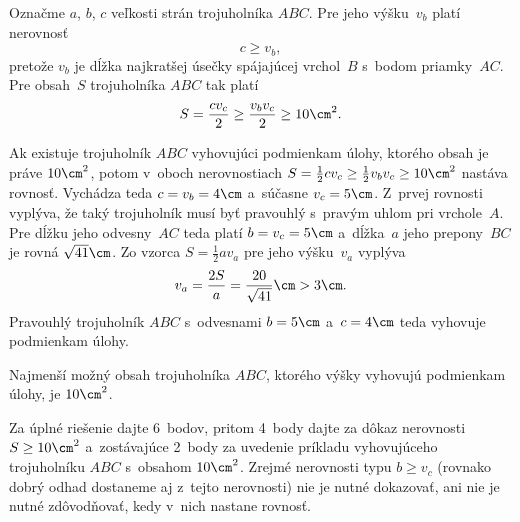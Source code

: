 {%
Označme $a$, $b$, $c$ veľkosti strán trojuholníka $ABC$.
Pre jeho výšku~$v_b$ platí nerovnosť
$$
c\ge v_b,
$$
pretože $v_b$ je dĺžka najkratšej úsečky spájajúcej vrchol~$B$
s~bodom priamky~$AC$. Pre obsah~$S$ trojuholníka $ABC$ tak platí
$$
S=\frac{cv_c}2\ge \frac{v_bv_c}2\ge10\cm^2.
$$


Ak existuje trojuholník $ABC$ vyhovujúci podmienkam úlohy,
ktorého obsah je práve $10\cm^2$, potom v~oboch nerovnostiach
$S=\frac12{cv_c}\ge\frac12{v_bv_c}\ge10\cm^2$ nastáva
rovnosť. Vychádza teda $c=v_b=4\cm$ a~súčasne $v_c=5\cm$.
Z~prvej rovnosti vyplýva, že taký trojuholník musí byť pravouhlý
s~pravým uhlom pri vrchole~$A$. Pre dĺžku jeho odvesny~$AC$ teda platí
$b=v_c=5\cm$ a~dĺžka~$a$ jeho prepony~$BC$ je rovná
$\sqrt{41}\cm$. Zo vzorca $S=\frac12{av_a}$ pre jeho
výšku~$v_a$ vyplýva
$$
v_a=\frac{2S}a=\frac{20}{\sqrt{41}}\cm>3\cm.
$$
Pravouhlý trojuholník $ABC$ s~odvesnami $b=5\cm$ a~$c=4\cm$
teda vyhovuje podmienkam úlohy.

Najmenší možný obsah trojuholníka $ABC$, ktorého výšky vyhovujú
podmienkam úlohy, je $10\cm^2$.


\nobreak\medskip\petit\noindent
Za úplné riešenie dajte 6~bodov, pritom 4~body dajte za dôkaz
nerovnosti $S\ge 10\cm^2$ a~zostávajúce 2~body za uvedenie
príkladu vyhovujúceho trojuholníku $ABC$ s~obsahom $10\cm^2$.
Zrejmé nerovnosti typu $b\ge v_c$ (rovnako dobrý odhad
dostaneme aj z~tejto nerovnosti) nie je nutné dokazovať,
ani nie je nutné zdôvodňovať, kedy v~nich nastane rovnosť.
\endpetit
\bigbreak
}

